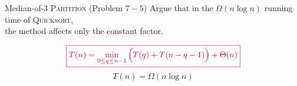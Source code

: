\begin{frame}{}
  \begin{exampleblock}{Median-of-3 \textsc{Partition} (Problem $7-5$)}
    Argue that in the $\Omega(n \log n)$ running time of \textsc{Quicksort}, \\
    the  method affects only the constant factor.
  \end{exampleblock}

  \pause

  \pause
  \[
    \textcolor{purple}{\boxed{T(n) = \min_{0 \le q \le n-1} \Big( T(q) + T(n-q-1) \Big) + \Theta(n)}}
  \]
  \[
    T(n) = \Omega(n \log n)
  \]
\end{frame}

\begin{frame}{}
  \begin{columns}
  \end{columns}
\end{frame}
